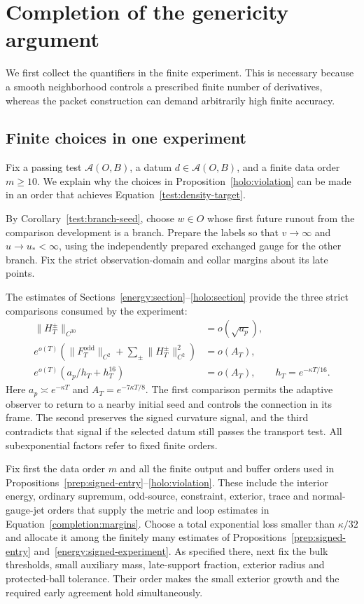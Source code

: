\section{Completion of the genericity argument}
\label{sec:completion}

We first collect the quantifiers in the finite experiment. This is
necessary because a smooth neighborhood controls a prescribed finite
number of derivatives, whereas the packet construction can demand
arbitrarily high finite accuracy.

\subsection{Finite choices in one experiment}\label{completion:destruction}

Fix a passing test $\mathcal A(O,B)$, a datum
$d\in\mathcal A(O,B)$, and a finite data order $m\ge10$.
We explain why the choices in Proposition~\ref{holo:violation} can
be made in an order that achieves Equation~\eqref{test:density-target}.

By Corollary~\ref{test:branch-seed}, choose $w\in O$ whose first
future runout from the comparison development is a branch. Prepare
the labels so that $v\to\infty$ and $u\to u_*<\infty$, using the
independently prepared exchanged gauge for the other branch. Fix the
strict observation-domain and collar margins about its late points.

The estimates of Sections~\ref{energy:section}--\ref{holo:section}
provide the three strict comparisons consumed by the experiment:
\begin{equation}\label{completion:margins}
\begin{aligned}
 \|H_T^\pm\|_{C^{30}}&=o(\sqrt{a_p}),\\
 e^{o(T)}\left(\|F_T^{\mathrm{odd}}\|_{C^2}
       +\sum_\pm\|H_T^\pm\|_{C^2}^2\right)&=o(A_T),\\
 e^{o(T)}(a_p/h_T+h_T^{16})&=o(A_T),
 \qquad h_T=e^{-\kappa T/16}.
\end{aligned}
\end{equation}
Here $a_p\asymp e^{-\kappa T}$ and $A_T=e^{-7\kappa T/8}$.
The first comparison permits the adaptive observer to return to a
nearby initial seed and controls the connection in its frame.
The second preserves the signed curvature signal,
and the third contradicts that signal if the selected datum still
passes the transport test. All subexponential factors refer to fixed
finite orders.

Fix first the data order $m$ and all the finite output and buffer orders
used in Propositions~\ref{prep:signed-entry}--\ref{holo:violation}.
These include the interior energy, ordinary supremum, odd-source,
constraint, exterior, trace and normal-gauge-jet orders that supply the
metric and loop estimates in Equation~\eqref{completion:margins}.
Choose a total exponential loss smaller than $\kappa/32$ and allocate
it among the finitely many estimates of
Propositions~\ref{prep:signed-entry} and~\ref{energy:signed-experiment}.
As specified there, next fix the bulk thresholds, small auxiliary mass,
late-support fraction, exterior radius and protected-ball tolerance.
Their order makes the small exterior growth and the required early
agreement hold simultaneously.

